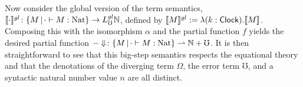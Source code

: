 Now consider the global version of the term semantics, $\llbracket {\cdot} \rrbracket^{gl} \colon
\{M \,|\, \cdot \vdash M : \text{Nat} \} \to L_\mho^{gl} \mathbb{N}$, defined by
$\llbracket {M} \rrbracket^{gl} := \lambda (k : \mathsf{Clock}) .\llbracket {M} \rrbracket$. Composing this with the
isomorphism $\alpha$ and the partial function $f$ yields the desired partial
function
%
$-\Downarrow \colon \{M \,|\, \cdot \vdash M : \text{Nat} \} \rightharpoonup \mathbb{N} + {\mho}$.
%
It is then straightforward to see that this big-step semantics respects the
equational theory and that the denotations of the diverging term $\Omega$, the
error term $\mho$, and a syntactic natural number value $n$ are all distinct.

